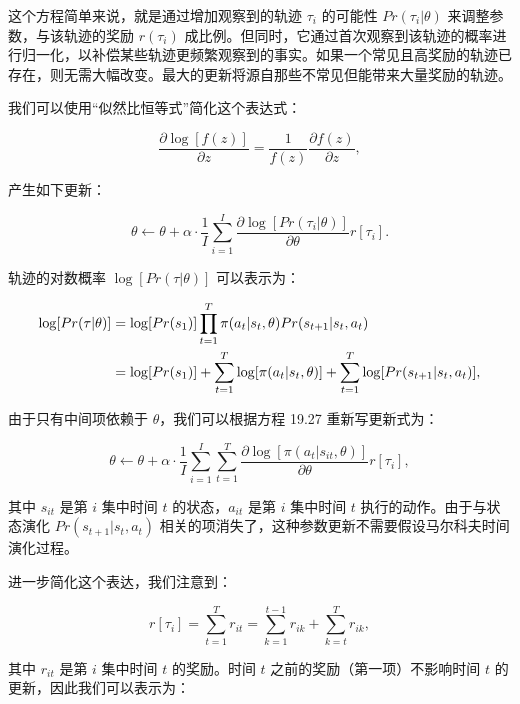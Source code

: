 \documentclass[lang=cn,newtx,10pt,scheme=chinese]{elegantbook}
\begin{document}
这个方程简单来说，就是通过增加观察到的轨迹 \(\tau_i\) 的可能性 \(Pr(\tau_i|\theta)\) 来调整参数，与该轨迹的奖励 \(r(\tau_i)\) 成比例。但同时，它通过首次观察到该轨迹的概率进行归一化，以补偿某些轨迹更频繁观察到的事实。如果一个常见且高奖励的轨迹已存在，则无需大幅改变。最大的更新将源自那些不常见但能带来大量奖励的轨迹。

我们可以使用“似然比恒等式”简化这个表达式：

\begin{equation}
\frac{\partial \log[f(z)]}{\partial z} = \frac{1}{f(z)} \frac{\partial f(z)}{\partial z}, 
\end{equation}

产生如下更新：

\begin{equation}
\theta \leftarrow \theta + \alpha \cdot \frac{1}{I} \sum_{i=1}^{I} \frac{\partial \log [Pr(\tau_i|\theta)]}{\partial \theta} r[\tau_i]. 
\end{equation}

轨迹的对数概率 \(\log[Pr(\tau|\theta)]\) 可以表示为：


\begin{align}
\log[Pr(\tau|\theta)] &= \log [Pr(s_1)] \prod_{t=1}^{T} \pi(a_t|s_t, \theta) Pr(s_{t+1}|s_t, a_t) \notag\\
&= \log [Pr(s_1)] + \sum_{t=1}^{T} \log [\pi(a_t|s_t, \theta)] + \sum_{t=1}^{T} \log [Pr(s_{t+1}|s_t, a_t)], 
\end{align} 


由于只有中间项依赖于 \(\theta\)，我们可以根据方程 19.27 重新写更新式为：

\begin{equation}
\theta \leftarrow \theta + \alpha \cdot \frac{1}{I} \sum_{i=1}^{I} \sum_{t=1}^{T} \frac{\partial \log [\pi(a_t|s_{it}, \theta)]}{\partial \theta} r[\tau_i], 
\end{equation}

其中 \(s_{it}\) 是第 \(i\) 集中时间 \(t\) 的状态，\(a_{it}\) 是第 \(i\) 集中时间 \(t\) 执行的动作。由于与状态演化 \(Pr(s_{t+1}|s_t, a_t)\) 相关的项消失了，这种参数更新不需要假设马尔科夫时间演化过程。

进一步简化这个表达，我们注意到：

\begin{equation}
r[\tau_i] = \sum_{t=1}^{T} r_{it} = \sum_{k=1}^{t-1} r_{ik} + \sum_{k=t}^{T} r_{ik}, 
\end{equation}

其中 \(r_{it}\) 是第 \(i\) 集中时间 \(t\) 的奖励。时间 \(t\) 之前的奖励（第一项）不影响时间 \(t\) 的更新，因此我们可以表示为：
\end{document}
